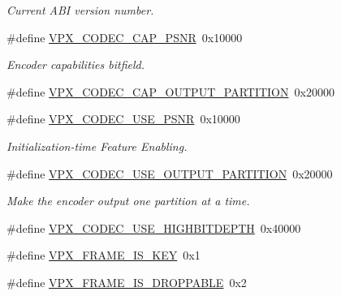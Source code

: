 \begin{DoxyCompactItemize}
\begin{DoxyCompactList}\small\item\em Current A\+BI version number. \end{DoxyCompactList}\item 
\#define \hyperlink{group__encoder_ga398803f408d6f71aae730b5ee7793e1c}{V\+P\+X\+\_\+\+C\+O\+D\+E\+C\+\_\+\+C\+A\+P\+\_\+\+P\+S\+NR}~0x10000
\begin{DoxyCompactList}\small\item\em Encoder capabilities bitfield. \end{DoxyCompactList}\item 
\#define \hyperlink{group__encoder_ga69768adb51faa28d98870cbc77e9ea93}{V\+P\+X\+\_\+\+C\+O\+D\+E\+C\+\_\+\+C\+A\+P\+\_\+\+O\+U\+T\+P\+U\+T\+\_\+\+P\+A\+R\+T\+I\+T\+I\+ON}~0x20000
\item 
\#define \hyperlink{group__encoder_ga57bb9eb1881c7e4bf86580660a5e40a0}{V\+P\+X\+\_\+\+C\+O\+D\+E\+C\+\_\+\+U\+S\+E\+\_\+\+P\+S\+NR}~0x10000
\begin{DoxyCompactList}\small\item\em Initialization-\/time Feature Enabling. \end{DoxyCompactList}\item 
\#define \hyperlink{group__encoder_gac26cd92b3719953aa0fbb0ff8c1d9c8d}{V\+P\+X\+\_\+\+C\+O\+D\+E\+C\+\_\+\+U\+S\+E\+\_\+\+O\+U\+T\+P\+U\+T\+\_\+\+P\+A\+R\+T\+I\+T\+I\+ON}~0x20000\hypertarget{group__encoder_gac26cd92b3719953aa0fbb0ff8c1d9c8d}{}\label{group__encoder_gac26cd92b3719953aa0fbb0ff8c1d9c8d}

\begin{DoxyCompactList}\small\item\em Make the encoder output one partition at a time. \end{DoxyCompactList}\item 
\#define \hyperlink{group__encoder_ga69576ef94099286853e64aee29661608}{V\+P\+X\+\_\+\+C\+O\+D\+E\+C\+\_\+\+U\+S\+E\+\_\+\+H\+I\+G\+H\+B\+I\+T\+D\+E\+P\+TH}~0x40000
\item 
\#define \hyperlink{group__encoder_ga7a896eb3bc74f33419e6a9812c60e4c9}{V\+P\+X\+\_\+\+F\+R\+A\+M\+E\+\_\+\+I\+S\+\_\+\+K\+EY}~0x1
\item 
\#define \hyperlink{group__encoder_gab899503032065a30ac6864b4c89626a9}{V\+P\+X\+\_\+\+F\+R\+A\+M\+E\+\_\+\+I\+S\+\_\+\+D\+R\+O\+P\+P\+A\+B\+LE}~0x2\hypertarget{group__encoder_gab899503032065a30ac6864b4c89626a9}{}\label{group__encoder_gab899503032065a30ac6864b4c89626a9}


\end{DoxyCompactItemize}
